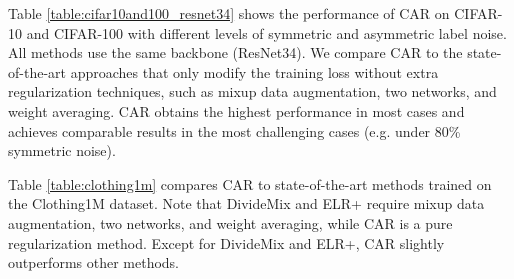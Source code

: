 \documentclass{article}
\begin{document}
Table \ref{table:cifar10and100_resnet34} shows the performance of CAR on CIFAR-10 and CIFAR-100 with different levels of symmetric and asymmetric label noise. All methods use the same backbone (ResNet34). We compare CAR to the state-of-the-art approaches that only modify the training loss without extra regularization techniques, such as mixup data augmentation, two networks, and weight averaging. CAR obtains the highest performance in most cases and achieves comparable results in the most challenging cases (e.g. under 80\% symmetric noise).

Table \ref{table:clothing1m} compares CAR to state-of-the-art methods trained on the Clothing1M dataset. Note that DivideMix and ELR+ require mixup data augmentation, two networks, and weight averaging, while CAR is a pure regularization method. Except for DivideMix and ELR+, CAR slightly outperforms other methods.
\end{document}

